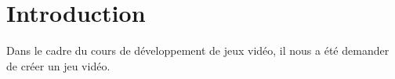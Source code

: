 \section{Introduction}
Dans le cadre du cours de développement de jeux vidéo, il nous a été demander de créer un jeu vidéo.
